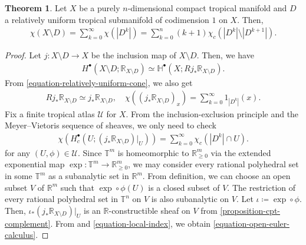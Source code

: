 \documentclass[a4paper,dvipdfmx,reqno,12pt]{amsart}
\theoremstyle{definition}
\newtheorem{theorem}{Theorem}[section]
\newcommand{\deq}{\coloneqq}
\newcommand{\opn}[1]{\operatorname{#1}}
\numberwithin{equation}{section}
\begin{document}
\begin{theorem}
\label{theorem-euler-power}
Let $X$ be a purely $n$-dimensional compact tropical manifold
and $D$ a relatively uniform tropical submanifold of
codimension $1$ on $X$. Then,
\begin{align}
\label{equation-euler-power}
\chi(X\setminus D)=\sum_{k=0}^{\infty}
\chi(|D^{k}|)=\sum_{k=0}^{n}(k+1)\chi_c(|D^{k}|\setminus
|D^{k+1}|).
\end{align}
\end{theorem}
\begin{proof}
Let $j\colon X\setminus D\to X$ be the inclusion map
of $X\setminus D$.
Then, we have 
\begin{align}
H^{\bullet}(X\setminus D;\mathbb{R}_{X\setminus D})
\simeq \mathbb{H}^{\bullet}(X;Rj_*\mathbb{R}_{X\setminus D}).
\end{align}
From \cref{equation-relatively-uniform-cone}, we also get
\begin{align}
\label{equation-local-index}
Rj_*\mathbb{R}_{X\setminus D}\simeq j_*\mathbb{R}_{X\setminus D},
\quad \chi((j_*\mathbb{R}_{X\setminus D})_x)=
\sum_{k=0}^{\infty}1_{|D^{k}|}(x).
\end{align}
Fix a finite tropical atlas $\mathcal{U}$ for $X$.
From the inclusion-exclusion principle and the Meyer--Vietoris
sequence of sheaves, we only need to check
\begin{align}
\label{equation-open-euler-calculus}
\chi(H^{\bullet}_c(U;(j_*\mathbb{R}_{X\setminus D})|_{U}))
=\sum_{k=0}^{\infty}\chi_c(|D^{k}|\cap U).
\end{align}
for any $(U,\phi)\in \mathcal{U}$.
Since $\mathbb{T}^{m}$ is homeomorphic to 
$\mathbb{R}_{\geq 0}^{m}$ via the extended exponential map
$\opn{exp}\colon \mathbb{T}^{m} \to \mathbb{R}_{\geq 0}^{m}$,
we may consider every rational
polyhedral set in some $\mathbb{T}^{m}$ as a
subanalytic set in $\mathbb{R}^{m}$.
From definition, we can choose an open subset $V$ of 
$\mathbb{R}^{m}$ such that $\opn{exp}\circ\phi(U)$ is
a closed subset of $V$.
The restriction of every rational polyhedral set in $\mathbb{T}^{n}$
on $V$ is also subanalytic \cite[Proposition 8.2.2.(iii)]{MR1299726}
on $V$. Let $\iota\deq \opn{exp}\circ \phi$.
Then, $\iota_*(j_*\mathbb{R}_{X\setminus D})|_{U}$
is an $\mathbb{R}$-constructible sheaf on $V$
\cite[Definition 8.4.3]{MR1299726} from \cref{proposition-cpt-complement}.
From \cite[Theorem 9.7.1]{MR1299726} and 
\eqref{equation-local-index}, we obtain
\eqref{equation-open-euler-calculus}.
\end{proof}
\end{document}
